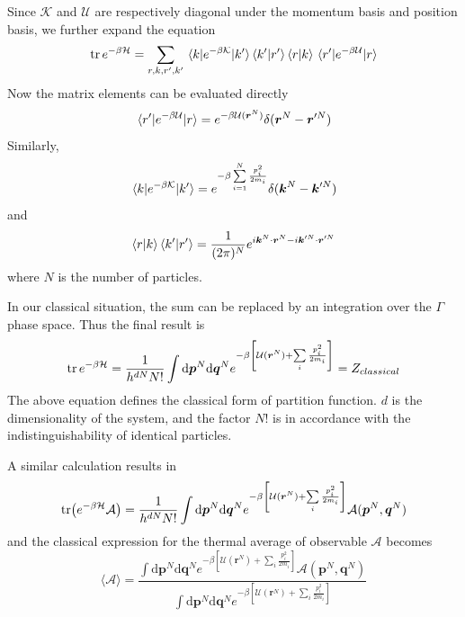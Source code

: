 \documentclass[letterpaper,12pt]{article}
\numberwithin{equation}{section}
\begin{document}
Since $\mathcal{K}$ and $\mathcal{U}$ are respectively diagonal under the momentum basis and position basis, we further expand the equation
\begin{equation}
    \tr e^{-\beta\mathcal{H}}=\sum\limits_{r,k,r',k'}\matrixelement{k}{e^{-\beta\mathcal{K}}}{k'}\braket{k'}{r'}\braket{r}{k}\matrixelement{r'}{e^{-\beta\mathcal{U}}}{r}
\end{equation}
Now the matrix elements can be evaluated directly
\begin{equation}
    \matrixelement{r'}{e^{-\beta\mathcal{U}}}{r}=e^{-\beta\mathcal{U}(\boldsymbol{r}^N)}\delta(\boldsymbol{r}^N-\boldsymbol{r}'^N)
\end{equation}
Similarly, 
\[
    \matrixelement{k}{e^{-\beta\mathcal{K}}}{k'}=e^{-\beta \sum\limits_{i=1}^{N}\frac{p_i^2}{2m_i}}\delta(\boldsymbol{k}^N-\boldsymbol{k}'^N)
\]
and
\[
    \braket{r}{k}\braket{k'}{r'}=\frac{1}{(2\pi)^N}e^{i\boldsymbol{k}^N\cdot\boldsymbol{r}^N-i\boldsymbol{k}'^N\cdot\boldsymbol{r}'^N}
\]
where $N$ is the number of particles.

In our classical situation, the sum can be replaced by an integration over the $\Gamma$ phase space. Thus the final result is 
\begin{equation}
    \tr e^{-\beta\mathcal{H}}=\frac{1}{h^{dN}N!}\int{\mathrm{d}\boldsymbol{p}^N\mathrm{d}\boldsymbol{q}^N}e^{-\beta\left[\mathcal{U}(\boldsymbol{r}^N)+\sum\limits_i{\frac{p_i^2}{2m_i}}\right]}=Z_{classical}
\end{equation}
The above equation defines the classical form of partition function. $d$ is the dimensionality of the system, and the factor $N!$ is in accordance with the indistinguishability of identical particles.

A similar calculation results in 
\begin{equation}
    \tr (e^{-\beta\mathcal{H}}\mathcal{A})=\frac{1}{h^{dN}N!}\int{\mathrm{d}\boldsymbol{p}^N\mathrm{d}\boldsymbol{q}^N}e^{-\beta\left[\mathcal{U}(\boldsymbol{r}^N)+\sum\limits_i{\frac{p_i^2}{2m_i}}\right]}\mathcal{A}(\boldsymbol{p}^N, \boldsymbol{q}^N)
\end{equation}
and the classical expression for the thermal average of observable $\mathcal{A}$ becomes
\begin{equation}
    \langle\mathcal{A}\rangle=\frac{\displaystyle\int{\mathrm{d}\boldsymbol{p}^N\mathrm{d}\boldsymbol{q}^N}e^{-\beta\left[\mathcal{U}(\boldsymbol{r}^N)+\sum\limits_i{\frac{p_i^2}{2m_i}}\right]}\mathcal{A}(\boldsymbol{p}^N, \boldsymbol{q}^N)}{\displaystyle\int{\mathrm{d}\boldsymbol{p}^N\mathrm{d}\boldsymbol{q}^N}e^{-\beta\left[\mathcal{U}(\boldsymbol{r}^N)+\sum\limits_i{\frac{p_i^2}{2m_i}}\right]}}
    \label{Eq:ave_ensemble}
\end{equation} 
\end{document}
